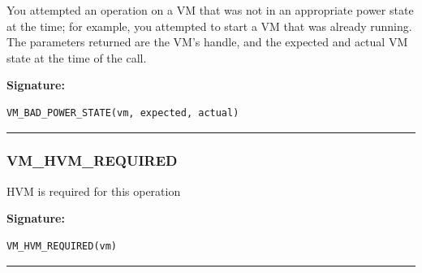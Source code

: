 You attempted an operation on a VM that was not in an appropriate power
state at the time; for example, you attempted to start a VM that was
already running.  The parameters returned are the VM's handle, and the
expected and actual VM state at the time of the call.

\vspace{0.3cm}
{\bf Signature:}
\begin{verbatim}VM_BAD_POWER_STATE(vm, expected, actual)\end{verbatim}
\begin{center}\rule{10em}{0.1pt}\end{center}

\subsubsection{VM\_HVM\_REQUIRED}

HVM is required for this operation

\vspace{0.3cm}
{\bf Signature:}
\begin{verbatim}VM_HVM_REQUIRED(vm)\end{verbatim}
\begin{center}\rule{10em}{0.1pt}\end{center}
